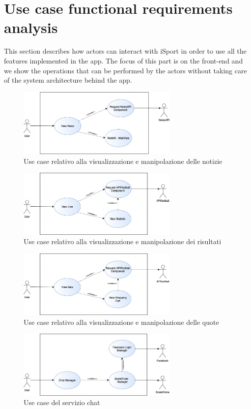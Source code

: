 \documentclass[numbers=noenddot, 12pt, a4paper, oneside]{scrbook}
\begin{document}
\chapter{Use case functional requirements analysis}
This section describes how actors can interact with iSport in order to use all the features implemented in the app. The focus of this part is on the front-end and we show the operations that can be performed by the actors without taking care of the system architecture behind the app.
\begin{figure}[H]
	\centering
	\includegraphics[width=0.7\textwidth]{images/ViewNews}
	\caption{Use case relativo alla visualizzazione e manipolazione delle notizie}
\end{figure}
\begin{figure}[H]
	\centering
	\includegraphics[width=0.7\textwidth]{images/ViewLive}
	\caption{Use case relativo alla visualizzazione e manipolazione dei risultati}
\end{figure}
\begin{figure}[H]
	\centering
	\includegraphics[width=0.7\textwidth]{images/ViewBet}
	\caption{Use case relativo alla visualizzazione e manipolazione delle quote}
\end{figure}
\begin{figure}[H]
	\centering
	\includegraphics[width=0.7\textwidth]{images/Chat}
	\caption{Use case del servizio chat}
\end{figure}
\end{document}
